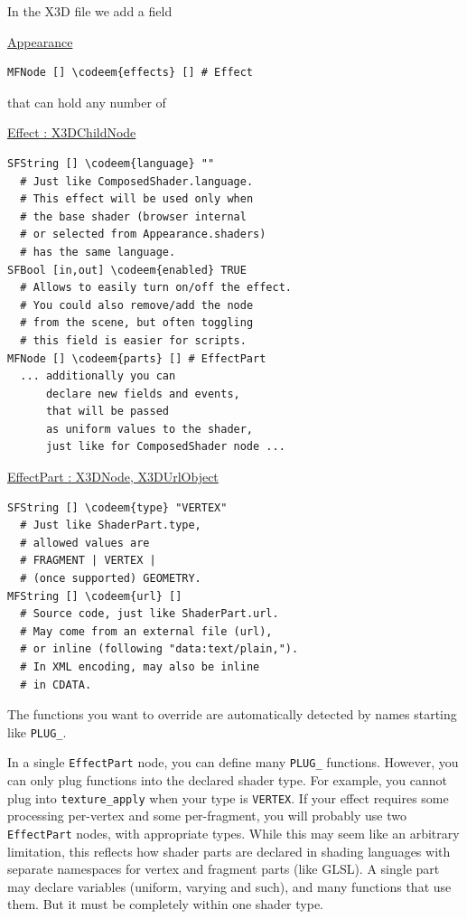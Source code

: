 \documentclass{acmsiggraph}                     %
\newenvironment{mycode}
{\begin{mycodecore}}
{\end{mycodecore}
\vspace{-0.1in}}
\newcommand*{\codeem}[1]{\textbf{#1}}
\begin{document}
In the X3D file we add a field

\begin{mycode}
\underline{Appearance}
\begin{Verbatim}[commandchars=\\\{\}]
MFNode [] \codeem{effects} [] # Effect
\end{Verbatim}
\end{mycode}

that can hold any number of

\begin{mycode}
\underline{Effect : X3DChildNode}
\begin{Verbatim}[commandchars=\\\{\}]
SFString [] \codeem{language} ""
  # Just like ComposedShader.language.
  # This effect will be used only when
  # the base shader (browser internal
  # or selected from Appearance.shaders)
  # has the same language.
SFBool [in,out] \codeem{enabled} TRUE
  # Allows to easily turn on/off the effect.
  # You could also remove/add the node
  # from the scene, but often toggling
  # this field is easier for scripts.
MFNode [] \codeem{parts} [] # EffectPart
  ... additionally you can
      declare new fields and events,
      that will be passed
      as uniform values to the shader,
      just like for ComposedShader node ...
\end{Verbatim}
\end{mycode}

\begin{mycode}
\underline{EffectPart : X3DNode, X3DUrlObject}
\begin{Verbatim}[commandchars=\\\{\}]
SFString [] \codeem{type} "VERTEX"
  # Just like ShaderPart.type,
  # allowed values are
  # FRAGMENT | VERTEX |
  # (once supported) GEOMETRY.
MFString [] \codeem{url} []
  # Source code, just like ShaderPart.url.
  # May come from an external file (url),
  # or inline (following "data:text/plain,").
  # In XML encoding, may also be inline
  # in CDATA.
\end{Verbatim}
\end{mycode}

The functions you want to override are automatically detected by names
starting like \texttt{PLUG\_}.

In a single \texttt{EffectPart} node, you can define many \texttt{PLUG\_}
functions. However, you can only plug functions into the declared shader
type. For example, you cannot plug into \texttt{texture\_apply} when
your type is \texttt{VERTEX}.
If your effect requires some processing per-vertex and some per-fragment,
you will probably use two \texttt{EffectPart} nodes, with appropriate types.
While this may seem like an arbitrary limitation,
this reflects how shader parts are declared in shading languages with
separate namespaces for vertex and fragment parts (like GLSL).
A single part may declare variables (uniform, varying and such),
and many functions that use them. But it must be completely within
one shader type.
\end{document}
